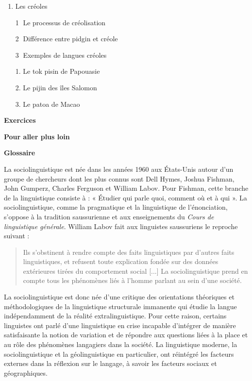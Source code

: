 \begin{keybox}
\begin{enumerate}[label=\arabic*.]
\item Les créoles\par \textcircled{\scriptsize 1} Le processus de créolisation\par \textcircled{\scriptsize 2} Différence entre pidgin et créole\par \textcircled{\scriptsize 3} Exemples de langues créoles\par\hspace*{1em}1. Le tok pisin de Papouasie\par\hspace*{1em}2. Le pijin des îles Salomon\par\hspace*{1em}3. Le patoa de Macao
\end{enumerate}
\textbf{Exercices}\par\textbf{Pour aller plus loin}\par\textbf{Glossaire}
\end{keybox}

\begin{keybox}[Introduction]
La sociolinguistique est née dans les années 1960 aux États-Unis autour d’un groupe de chercheurs dont les plus connus sont Dell Hymes, Joshua Fishman, John Gumperz, Charles Ferguson et William Labov. Pour Fishman, cette branche de la linguistique consiste à : « Étudier qui parle quoi, comment où et à qui ». La sociolinguistique, comme la pragmatique et la linguistique de l’énonciation, s’oppose à la tradition saussurienne et aux enseignements du \textit{Cours de linguistique générale}. William Labov fait aux linguistes saussuriens le reproche suivant :
\begin{quote}
Ils s’obstinent à rendre compte des faits linguistiques par d’autres faits linguistiques, et refusent toute explication fondée sur des données extérieures tirées du comportement social [...] La sociolinguistique prend en compte tous les phénomènes liés à l’homme parlant au sein d’une société.
\end{quote}
La sociolinguistique est donc née d’une critique des orientations théoriques et méthodologiques de la linguistique structurale immanente qui étudie la langue indépendamment de la réalité extralinguistique. Pour cette raison, certains linguistes ont parlé d’une linguistique en crise incapable d’intégrer de manière satisfaisante la notion de variation et de répondre aux questions liées à la place et au rôle des phénomènes langagiers dans la société. La linguistique moderne, la sociolinguistique et la géolinguistique en particulier, ont réintégré les facteurs externes dans la réflexion sur le langage, à savoir les facteurs sociaux et géographiques.
\end{keybox}

